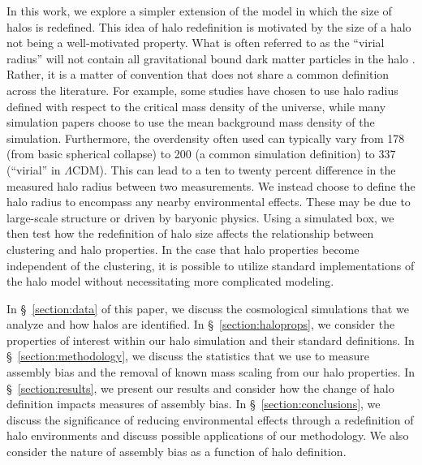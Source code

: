 \documentclass[usenatbib,usegraphicx,letterpaper]{mn2e}
\begin{document}
In this work, we explore a simpler extension of the model in which the size of halos is redefined. This idea of halo redefinition is motivated by the size of a halo not being a well-motivated property. What is often referred to as the ``virial radius'' will not contain all gravitational bound dark matter particles in the halo \citep{kazan06}. Rather, it is a matter of convention that does not share a common definition across the literature. For example, some studies have chosen to use halo radius defined with respect to the critical mass density of the universe, while many simulation papers choose to use the mean background mass density of the simulation.  Furthermore, the overdensity often used can typically vary from 178 (from basic spherical collapse) to 200 (a common simulation definition) to 337 (``virial'' in $\Lambda\mathrm{CDM}$). This can lead to a ten to twenty percent difference in the measured halo radius between two measurements. We instead choose to define the halo radius to encompass any nearby environmental effects. These may be due to large-scale structure or driven by baryonic physics. Using a simulated box, we then test how the redefinition of halo size affects the relationship between clustering and halo properties. In the case that halo properties become independent of the clustering, it is possible to utilize standard implementations of the halo model without necessitating more complicated modeling.
 
In \S~\ref{section:data} of this paper, we discuss the cosmological simulations that we analyze and how halos are identified. In \S~\ref{section:haloprops}, we consider the properties of interest within our halo simulation and their standard definitions. In \S~\ref{section:methodology}, we discuss the statistics that we use to measure assembly bias and the removal of known mass scaling from our halo properties. In \S~\ref{section:results}, we present our results and consider how the change of halo definition impacts measures of assembly bias. In \S~\ref{section:conclusions}, we discuss the significance of reducing environmental effects through a redefinition of halo environments and discuss possible applications of our methodology. We also consider the nature of assembly bias as a function of halo definition.

\end{document}
